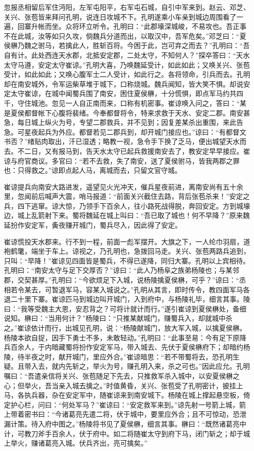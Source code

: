 忽报丞相留后军住沔阳，左军屯阳平，右军屯石城，自引中军来到。赵云、邓芝、关兴、张苞皆来拜问孔明，说连日攻城不下。孔明遂乘小车亲到城边周围看了一遍，回寨升帐而坐。众将环立听令。孔明曰：“此郡壕深城峻，不易攻也。吾正事不在此城，汝等如只久攻，倘魏兵分道而出，以取汉中，吾军危矣。”邓芝曰：“夏侯楙乃魏之驸马，若擒此人，胜斩百将。今困于此，岂可弃之而去？”孔明曰：“吾自有计。此处西连天水郡，北抵安定郡，二处太守，不知何人？”探卒答曰：“天水太守马遵，安定太守崔谅。”孔明大喜，乃唤魏延受计，如此如此；又唤关兴、张苞受计，如此如此；又唤心腹军士二人受计，如此行之。各将领命，引兵而去。孔明却在南安城外，令军运柴草堆于城下，口称烧城。魏兵闻知，皆大笑不惧。却说安定太守崔谅，在城中闻蜀兵围了南安，困住夏侯楙，十分慌惧，即点军马约共四千，守住城池。忽见一人自正南而来，口称有机密事。崔谅唤入问之，答曰：“某是夏侯都督帐下心腹将裴绪。今奉都督将令，特来求救于天水、安定二郡。南安甚急，每日城上纵火为号，专望二郡救兵，并不见到；因复差某杀出重围，来此告急。可星夜起兵为外应。都督若见二郡兵到，却开城门接应也。”谅曰：“有都督文书否？”绪贴肉取出，汗已湿透；略教一视，急令手下换了乏马，便出城望天水而去。不二日，又有报马到，告天水太守已起兵救援南安去了，教安定早早接应。崔谅与府官商议。多官曰：“若不去救，失了南安，送了夏侯驸马，皆我两郡之罪也：只得救之。”谅即点起人马，离城而去，只留文官守城。

崔谅提兵向南安大路进发，遥望见火光冲天，催兵星夜前进，离南安尚有五十余里，忽闻前后喊声大震，哨马报道：“前面关兴截住去路，背后张苞杀来！”安定之兵，四下逃窜。谅大惊，乃领手下百余人，往小路死战得脱，奔回安定。方到城壕边，城上乱箭射下来。蜀将魏延在城上叫曰：“吾已取了城也！何不早降？”原来魏延扮作安定军，夤夜赚开城门，蜀兵尽入，因此得了安定。

崔谅慌投天水郡来。行不到一程，前面一彪军摆开。大旗之下，一人纶巾羽扇，道袍鹤氅，端坐于车上。谅视之，乃孔明也，急拨回马走。关兴、张苞两路兵追到，只叫：“早降！”崔谅见四面皆是蜀兵，不得已遂降，同归大寨。孔明以上宾相待。孔明曰：“南安太守与足下交厚否？”谅曰：“此人乃杨阜之族弟杨陵也；与某邻郡，交契甚厚。”孔明曰：“今欲烦足下入城，说杨陵擒夏侯楙，可乎？”谅曰：“丞相若令某去，可暂退军马，容某入城说之。”孔明从其言，即时传令，教四面军马各退二十里下寨。崔谅匹马到城边叫开城门，入到府中，与杨陵礼毕，细言其事。陵曰：“我等受魏主大恩，安忍背之？可将计就计而行。”遂引崔谅到夏侯楙处，备细说知。楙曰：“当用何计？”杨陵曰：“只推某献城门，赚蜀兵入，却就城中杀之。”崔谅依计而行，出城见孔明，说：“杨陵献城门，放大军入城，以擒夏侯楙。杨陵本欲自捉，因手下勇士不多，未敢轻动。”孔明曰：“此事至易：今有足下原降兵百余人，于内暗藏蜀将扮作安定军马，带入城去、先伏于夏侯楙府下；却暗约杨陵，待半夜之时，献开城门，里应外合。”崔谅暗思：“若不带蜀将去，恐孔明生疑。且带入去，就内先斩之，举火为号，赚孔明入来，杀之可也。”因此应允。孔明嘱曰：“吾遣亲信将关兴、张苞随足下先去，只推救军杀入城中，以安夏侯楙之心；但举火，吾当亲入城去擒之。”时值黄昏，关兴、张苞受了孔明密计，披挂上马，各执兵器，杂在安定军中，随崔谅来到南安城下。杨陵在城上撑起悬空板，倚定护心栏，问曰：“何处军马？”崔谅曰：“安定救军来到。”谅先射一号箭上城，箭上带着密书曰：“今诸葛亮先遣二将，伏于城中，要里应外合；且不可惊动，恐泄漏计策。待入府中图之。”杨陵将书见了夏侯楙，细言其事。楙曰：“既然诸葛亮中计，可教刀斧手百余人，伏于府中。如二将随崔太守到府下马，闭门斩之；却于城上举火，赚诸葛亮入城。伏兵齐出，亮可擒矣。”

